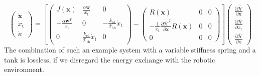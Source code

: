 \documentclass[a4paper,twoside, openright,12pt]{report}
\newcommand{\f}[1]{\boldsymbol{#1}}
\newcommand{\g}[1]{\text{#1}}
\begin{document}
\begin{equation}
\begin{pmatrix}
\dot{\f{x}} \\ \dot{x}_\g{t} \\ \dot{\kappa}
\end{pmatrix} =
\left[
\begin{pmatrix}
J(\f{x}) & \frac{\alpha \f{w}}{x_\g{t}} & 0\\ -\frac{\alpha \f{w}^T}{x_\g{t}} & 0 & -\frac{k_{vb}}{\mathcal{T}_{\g{th}}}\dot{x}_\g{t} \\ 0 & \frac{k_{vb}}{\mathcal{T}_{\g{th}}}\dot{x}_\g{t} & 0\end{pmatrix}
- 
\begin{pmatrix}
R(\f{x}) & 0 & 0\\ -\frac{1}{x_\g{t}}\frac{\partial \bar{\mathcal{H}}^T}{\partial \f{x}}R(\f{x}) & 0 & 0 \\ 0 & 0 & 0
\end{pmatrix}
\right]
\begin{pmatrix}
\frac{\partial \bar{\mathcal{H}}}{\partial \f{x}} \\
\frac{\partial \bar{\mathcal{H}}}{\partial x_\g{t}} \\
\frac{\partial \bar{\mathcal{H}}}{\partial \kappa} 
\end{pmatrix}
\end{equation}
The combination of such an example system with a variable stiffness spring and a tank is lossless, if we disregard the energy exchange with the robotic environment.
\end{document}
